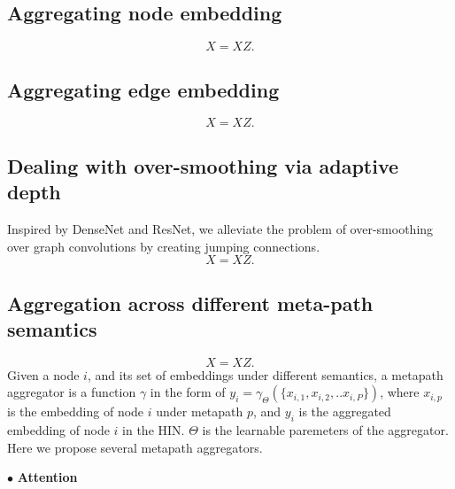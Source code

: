 \subsection{Aggregating node embedding}

\begin{equation}
\label{eq:update_node}
X = XZ.
\end{equation} 

\subsection{Aggregating edge embedding}
\begin{equation}
\label{eq:update_edge}
X = XZ.
\end{equation} 


\subsection{Dealing with over-smoothing via adaptive depth}
Inspired by DenseNet and ResNet, we alleviate the problem of over-smoothing over graph convolutions by creating jumping connections.
\begin{equation}
\label{eq:update_edge}
X = XZ.
\end{equation} 

\subsection{Aggregation across different meta-path semantics}
\begin{equation}
\label{eq:update_edge}
X = XZ.
\end{equation}
Given a node $i$, and its set of embeddings under different semantics, a metapath aggregator is a function $\gamma$ in the form of $y_i = \gamma_\Theta(\{x_{i,1},x_{i,2},..x_{i,P}\})$, where $x_{i,p}$ is the embedding of node $i$ under metapath $p$, and $y_i$ is the aggregated embedding of node $i$ in the HIN. $\Theta$ is the learnable paremeters of the aggregator.
Here we propose several metapath aggregators. 

$\bullet$ \textbf{Attention}

